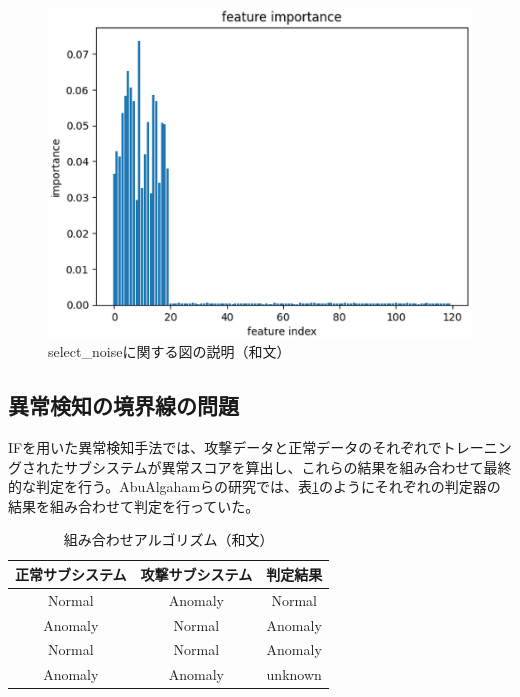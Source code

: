 \documentclass{css}
\begin{document}
\begin{figure}[tb]
    \centering
    \includegraphics[width=\linewidth]{pictures/eps/select_noise.eps}
    \caption{select\_noiseに関する図の説明（和文）}
    \label{fig:select_noise}
\end{figure}

\subsection{異常検知の境界線の問題}
IFを用いた異常検知手法では、攻撃データと正常データのそれぞれでトレーニングされたサブシステムが異常スコアを算出し、これらの結果を組み合わせて最終的な判定を行う。AbuAlgahamらの研究では、表\ref{tab:combination}のようにそれぞれの判定器の結果を組み合わせて判定を行っていた。

\begin{table}[tb]
    \caption{組み合わせアルゴリズム（和文）}
    \centering
    \footnotesize
    \begin{tabular}{ccc}
        \hline
        正常サブシステム & 攻撃サブシステム & 判定結果\\
        \hline
        Normal & Anomaly & Normal \\
        Anomaly & Normal & Anomaly \\
        Normal & Normal & Anomaly \\
        Anomaly & Anomaly & unknown \\
        \hline
    \end{tabular}
    \label{tab:combination}
\end{table}
\end{document}
